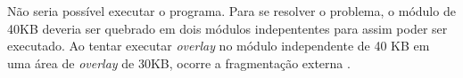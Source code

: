 
Não seria possível executar o programa. Para se resolver o problema, o módulo
de 40KB deveria ser quebrado em dois módulos indepententes para assim poder 
ser executado.  Ao tentar executar \textsl{overlay} no módulo independente de
40 KB em uma área de \textsl{overlay} de 30KB, ocorre a fragmentação 
externa \cite{ContiguousTechniques}.

